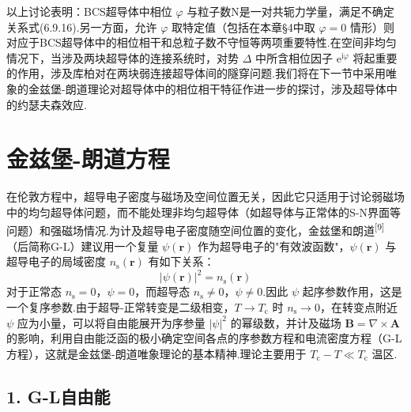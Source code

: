 以上讨论表明：BCS超导体中相位 $\varphi$ 与粒子数N是一对共轭力学量，满足不确定关系式(6.9.16).另一方面，允许 $\varphi$ 取特定值（包括在本章§4中取 $\varphi=0$ 情形）则对应于BCS超导体中的相位相干和总粒子数不守恒等两项重要特性.在空间非均匀情况下，当涉及两块超导体的连接系统时，对势 $\Delta$ 中所含相位因子 $\mathrm{e}^{\mathrm{i}\varphi}$ 将起重要的作用，涉及库柏对在两块弱连接超导体间的隧穿问题.我们将在下一节中采用唯象的金兹堡-朗道理论对超导体中的相位相干特征作进一步的探讨，涉及超导体中的约瑟夫森效应.

\section{金兹堡-朗道方程}

在伦敦方程中，超导电子密度与磁场及空间位置无关，因此它只适用于讨论弱磁场中的均匀超导体问题，而不能处理非均匀超导体（如超导体与正常体的S-N界面等问题）和强磁场情况.为计及超导电子密度随空间位置的变化，金兹堡和朗道\textsuperscript{[9]}（后简称G-L）建议用一个复量 $\psi(\boldsymbol{r})$ 作为超导电子的"有效波函数"，$\psi(\boldsymbol{r})$ 与超导电子的局域密度 $n_{\mathrm{s}}(\boldsymbol{r})$ 有如下关系：
\begin{equation}
  |\psi(\boldsymbol{r})|^{2}=n_{\mathrm{s}}(\boldsymbol{r})
\end{equation}
对于正常态 $n_{\mathrm{s}}=0$，$\psi=0$，而超导态 $n_{\mathrm{s}}\neq0$，$\psi\neq0$.因此 $\psi$ 起序参数作用，这是一个复序参数.由于超导-正常转变是二级相变，$T\to T_{\mathrm{c}}$ 时 $n_{\mathrm{s}}\to0$，在转变点附近 $\psi$ 应为小量，可以将自由能展开为序参量 $|\psi|^{2}$ 的幂级数，并计及磁场 $\boldsymbol{B}=\nabla\times\boldsymbol{A}$ 的影响，利用自由能泛函的极小确定空间各点的序参数方程和电流密度方程（G-L方程），这就是金兹堡-朗道唯象理论的基本精神.理论主要用于 $T_{\mathrm{c}}-T\ll T_{\mathrm{c}}$ 温区.

\subsection*{1. G-L自由能}

